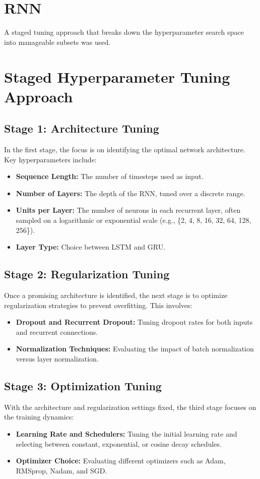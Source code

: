 
\section{RNN}




A staged tuning approach that breaks down the hyperparameter search space into manageable subsets was used.

\section{Staged Hyperparameter Tuning Approach}

\subsection{Stage 1: Architecture Tuning}
In the first stage, the focus is on identifying the optimal network architecture. Key hyperparameters include:
\begin{itemize}
    \item \textbf{Sequence Length:} The number of timesteps used as input.
    \item \textbf{Number of Layers:} The depth of the RNN, tuned over a discrete range.
    \item \textbf{Units per Layer:} The number of neurons in each recurrent layer, often sampled on a logarithmic or exponential scale (e.g., \{2, 4, 8, 16, 32, 64, 128, 256\}).
    \item \textbf{Layer Type:} Choice between LSTM and GRU.
\end{itemize}

\subsection{Stage 2: Regularization Tuning}
Once a promising architecture is identified, the next stage is to optimize regularization strategies to prevent overfitting. This involves:
\begin{itemize}
    \item \textbf{Dropout and Recurrent Dropout:} Tuning dropout rates for both inputs and recurrent connections.
    \item \textbf{Normalization Techniques:} Evaluating the impact of batch normalization versus layer normalization.
\end{itemize}

\subsection{Stage 3: Optimization Tuning}
With the architecture and regularization settings fixed, the third stage focuses on the training dynamics:
\begin{itemize}
    \item \textbf{Learning Rate and Schedulers:} Tuning the initial learning rate and selecting between constant, exponential, or cosine decay schedules.
    \item \textbf{Optimizer Choice:} Evaluating different optimizers such as Adam, RMSprop, Nadam, and SGD.
\end{itemize}

